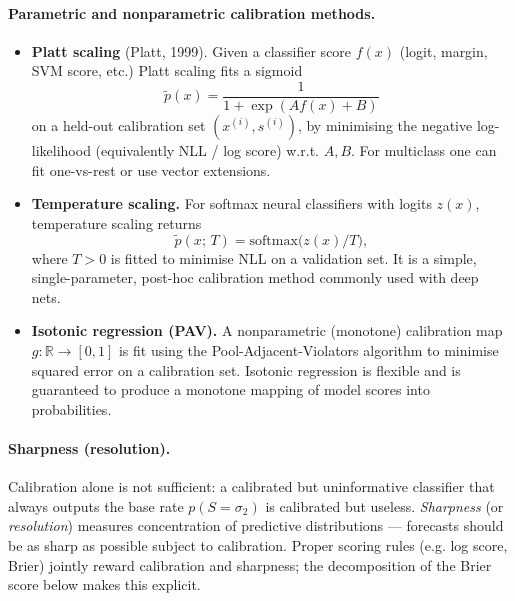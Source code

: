 \paragraph{Parametric and nonparametric calibration methods.}
\begin{itemize}
	\item \textbf{Platt scaling} (Platt, 1999). Given a classifier score \(f(x)\) (logit, margin, SVM score, etc.) Platt scaling fits a sigmoid
	\[
	\tilde p(x) = \frac{1}{1+\exp(A f(x) + B)}
	\]
	on a held-out calibration set \((x^{(i)},s^{(i)})\), by minimising the negative log-likelihood (equivalently NLL / log score) w.r.t. \(A,B\).  For multiclass one can fit one-vs-rest or use vector extensions.
	\item \textbf{Temperature scaling.} For softmax neural classifiers with logits \(z(x)\), temperature scaling returns
	\[
	\tilde p(x;\,T) = \mathrm{softmax}\big(z(x)/T\big),
	\]
	where \(T>0\) is fitted to minimise NLL on a validation set. It is a simple, single-parameter, post-hoc calibration method commonly used with deep nets.
	\item \textbf{Isotonic regression (PAV).} A nonparametric (monotone) calibration map \(g:\mathbb{R}\to[0,1]\) is fit using the Pool-Adjacent-Violators algorithm to minimise squared error on a calibration set. Isotonic regression is flexible and is guaranteed to produce a monotone mapping of model scores into probabilities.
\end{itemize}

\paragraph{Sharpness (resolution).}
Calibration alone is not sufficient: a calibrated but uninformative classifier that always outputs the base rate \(p(S=\sigma_2)\) is calibrated but useless. \emph{Sharpness} (or \emph{resolution}) measures concentration of predictive distributions — forecasts should be as sharp as possible subject to calibration. Proper scoring rules (e.g. log score, Brier) jointly reward calibration and sharpness; the decomposition of the Brier score below makes this explicit.

